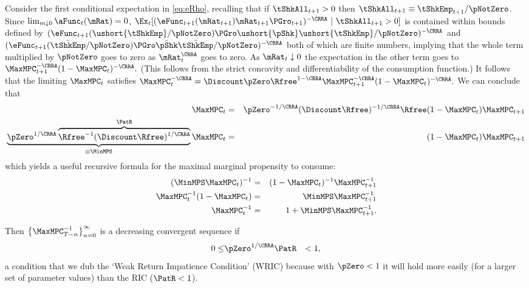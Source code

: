 \documentclass[titlepage]{\econtex}\providecommand{\texname}{BufferStockTheory}%
\begin{document}
Consider the first conditional expectation in \eqref{eq:eRho},
recalling that if $\tShkAll_{t+1}>0$ then $\tShkAll_{t+1} \equiv
\tShkEmp_{t+1}/\pNotZero$.  Since $\lim_{m \downarrow 0}
\aFunc_{t}(\mRat) = 0$,
$\Ex_{t}[(\eFunc_{t+1}(\mRat_{t+1})\mRat_{t+1}\PGro_{t+1})^{-\CRRA}~|~\tShkAll_{t+1}>0]$
is contained within bounds defined by
$(\eFunc_{t+1}(\ushort{\tShkEmp}/\pNotZero) \PGro\ushort{\pShk}
\ushort{\tShkEmp}/\pNotZero)^{-\CRRA}$ and
$(\eFunc_{t+1}(\bar{\tShkEmp}/\pNotZero) \PGro\bar{\pShk}
\bar{\tShkEmp}/\pNotZero)^{-\CRRA}$ both of which are finite numbers,
implying that the whole term multiplied by $\pNotZero$ goes to zero as
$\mRat_{t}^{\CRRA}$ goes to zero.  As $\mRat_{t} \downarrow 0$ the
expectation in the other term goes to $\MaxMPC _{t+1}^{-\CRRA
}(1-\MaxMPC _{t})^{-\CRRA }.$ (This follows from the strict concavity
and differentiability of the consumption function.) It follows that
the limiting $\MaxMPC_{t}$ satisfies $\MaxMPC_{t}^{-\CRRA }=\Discount
\pZero\Rfree^{1-\CRRA }\MaxMPC_{t+1}^{-\CRRA }(1-\MaxMPC
_{t})^{-\CRRA }.$ We can conclude that
\begin{eqnarray}
\MaxMPC_{t}&=&\pZero^{-1/\CRRA} (\Discount
\Rfree)^{-1/\CRRA}\Rfree(1-\MaxMPC _{t})\MaxMPC _{t+1} \notag
\\ \underbrace{\pZero^{1/\CRRA}\overbrace{{\Rfree}^{-1}(\Discount
    \Rfree)^{1/\CRRA}}^{\PatR}}_{\equiv \MinMPS}
\MaxMPC_{t}&=&(1-\MaxMPC _{t})\MaxMPC _{t+1} \label{eq:MinMPSDef}
\end{eqnarray}
which yields a useful recursive formula for the maximal marginal propensity to consume:
\begin{eqnarray}
  (\MinMPS \MaxMPC_{t})^{-1} & = & (1-\MaxMPC_{t})^{-1}\MaxMPC_{t+1}^{-1}  \notag
\\ \MaxMPC_{t}^{-1}(1-\MaxMPC_{t}) & = & \MinMPS \MaxMPC_{t+1}^{-1} \label{eq:muDiff} \notag
\\ \MaxMPC_{t}^{-1} & = & 1+\MinMPS \MaxMPC_{t+1}^{-1} \label{eq:MaxMPCInv}.
\end{eqnarray}

Then
$\left\{\MaxMPC_{T-n}^{-1}\right\} _{n=0}^{\infty}$ is a decreasing %
convergent sequence if
\begin{eqnarray}
  0 \leq & \pZero^{1/\CRRA} \PatR & < 1 \label{eq:WRIC},
\end{eqnarray}
a condition that we dub the `Weak Return Impatience Condition' (WRIC)
because with $\pZero < 1$ it will hold more easily (for a larger set of parameter
values) than the RIC ($\PatR < 1$).
\end{document}
